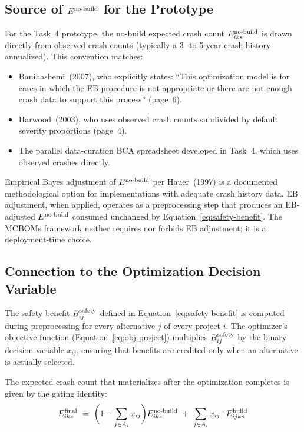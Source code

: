 \subsection{Source of $E^{\mathrm{no\text{-}build}}$ for the Prototype}

For the Task~4 prototype, the no-build expected crash count
$E^{\mathrm{no\text{-}build}}_{iks}$ is drawn directly from observed crash counts (typically a
3- to 5-year crash history annualized). This convention matches:
\begin{itemize}[leftmargin=2em, itemsep=2pt]
  \item Banihashemi~(2007), who explicitly states: ``This optimization model
    is for cases in which the EB procedure is not appropriate or there are
    not enough crash data to support this process'' (page~6).
  \item Harwood~(2003), who uses observed crash counts subdivided by default
    severity proportions (page~4).
  \item The parallel data-curation BCA spreadsheet developed in Task~4, which
    uses observed crashes directly.
\end{itemize}

Empirical Bayes adjustment of $E^{\mathrm{no\text{-}build}}$ per Hauer~(1997) is a documented
methodological option for implementations with adequate crash history data.
EB adjustment, when applied, operates as a preprocessing step that produces
an EB-adjusted $E^{\mathrm{no\text{-}build}}$ consumed unchanged by
Equation~\ref{eq:safety-benefit}. The MCBOMs framework neither requires nor
forbids EB adjustment; it is a deployment-time choice.

\subsection{Connection to the Optimization Decision Variable}

The safety benefit $B^{\mathrm{safety}}_{ij}$ defined in Equation~\ref{eq:safety-benefit}
is computed during preprocessing for every alternative $j$ of every project
$i$. The optimizer's objective function
(Equation~\ref{eq:obj-project}) multiplies $B^{\mathrm{safety}}_{ij}$ by the binary
decision variable $x_{ij}$, ensuring that benefits are credited only when an
alternative is actually selected.

The expected crash count that materializes after the optimization completes
is given by the gating identity:
\begin{equation}
E_{iks}^{\mathrm{final}}\ =\ \biggl(1 - \sum_{j \in A_i} x_{ij}\biggr) E^{\mathrm{no\text{-}build}}_{iks}\ +\ \sum_{j \in A_i} x_{ij} \cdot E^{\mathrm{build}}_{ijks}
\label{eq:gating}
\end{equation}

